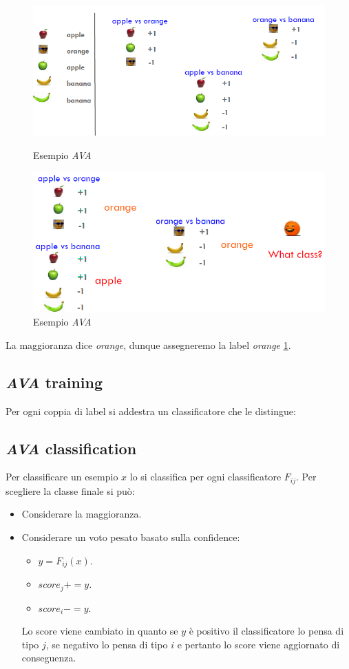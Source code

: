 \begin{figure}
	\centering
	\begin{minipage}{.5\textwidth}
		\centering
		\includegraphics[width=0.8\linewidth]{imgs/chapter6/img2}
		\caption{Esempio \emph{AVA}}
		\label{fig:chapter06-02}
	\end{minipage}%
	\begin{minipage}{.5\textwidth}
		\centering
		\includegraphics[width=0.8\linewidth]{imgs/chapter6/img3}
		\caption{Esempio \emph{AVA}}
		\label{fig:chapter06-03}
	\end{minipage}
\end{figure}
La maggioranza dice \emph{orange}, dunque assegneremo la label \emph{orange} \ref{fig:chapter06-03}.
	\subsection{\emph{AVA} training}
	Per ogni coppia di label si addestra un classificatore che le distingue:\\
	



	\subsection{\emph{AVA} classification}
	Per classificare un esempio $x$ lo si classifica per ogni classificatore $F_{ij}$.
	Per scegliere la classe finale si pu\`o:
	\begin{itemize}
		\item Considerare la maggioranza.
		\item Considerare un voto pesato basato sulla confidence:
		\begin{itemize}
			\item $y = F_{ij}(x)$.
			\item $score_j +=y$.
			\item $score_i -=y$.
		\end{itemize}
		Lo score viene cambiato in quanto se $y$ \`e positivo il classificatore lo pensa di tipo $j$, se negativo lo pensa di tipo $i$ e pertanto lo score viene aggiornato di conseguenza.
	\end{itemize}
	
